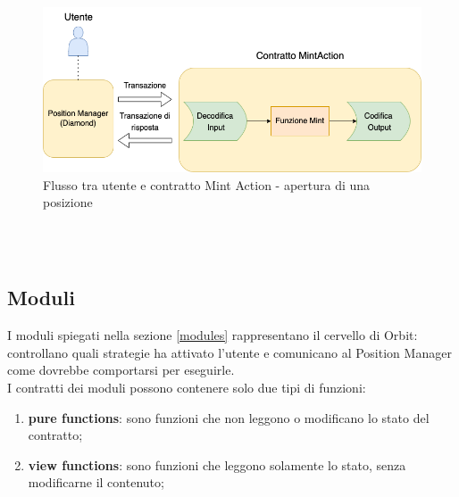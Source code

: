 \documentclass[12pt,a4paper]{report}
\begin{document}
\begin{figure}[H]
  \includegraphics[scale=0.55]{mint_action.png}
  \centering
  \caption{Flusso tra utente e contratto Mint Action - apertura di una posizione}
  \label{fig:mint_action}
\end{figure}


\\\\
\subsection{Moduli}

I moduli spiegati nella sezione \ref{modules} rappresentano il cervello di Orbit: controllano quali strategie ha attivato l'utente e comunicano al Position Manager come dovrebbe comportarsi per eseguirle.
\\I contratti dei moduli possono contenere solo due tipi di funzioni:
\\
\begin{enumerate}
    \item \textbf{pure functions}: sono funzioni che non leggono o modificano lo stato del contratto;
    \item \textbf{view functions}: sono funzioni che leggono solamente lo stato, senza modificarne il contenuto;
\end{enumerate}
\end{document}
